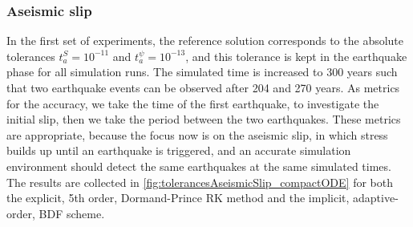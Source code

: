 \subsubsection{Aseismic slip}
In the first set of experiments, the reference solution corresponds to the absolute tolerances $t_a^S =10^{-11}$ and $t_a^\psi =10^{-13}$, and this tolerance is kept in the earthquake phase for all simulation runs. The simulated time is increased to 300 years such that two earthquake events can be observed after 204 and 270 years. As metrics for the accuracy, we take the time of the first earthquake, to investigate the initial slip, then we take the period between the two earthquakes. These metrics are appropriate, because the focus now is on the aseismic slip, in which stress builds up until an earthquake is triggered, and an accurate simulation environment should detect the same earthquakes at the same simulated times. The results are collected in \autoref{fig:tolerancesAseismicSlip_compactODE} for both the explicit, 5th order, Dormand-Prince RK method and the implicit, adaptive-order, BDF scheme. 
